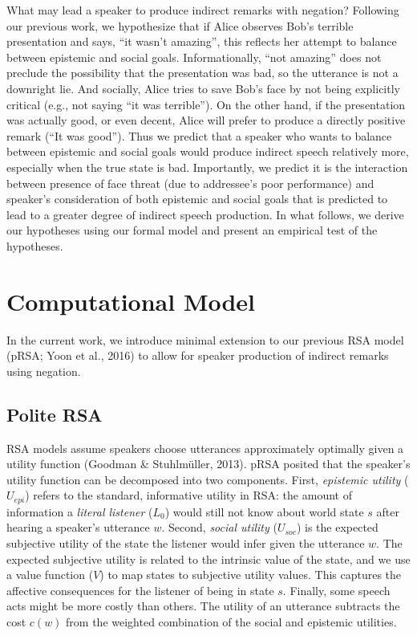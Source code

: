 \documentclass[10pt, letterpaper]{article}
\begin{document}
What may lead a speaker to produce indirect remarks with negation?
Following our previous work, we hypothesize that if Alice observes Bob's
terrible presentation and says, ``it wasn't amazing'', this reflects her
attempt to balance between epistemic and social goals. Informationally,
``not amazing'' does not preclude the possibility that the presentation
was bad, so the utterance is not a downright lie. And socially, Alice
tries to save Bob's face by not being explicitly critical (e.g., not
saying ``it was terrible''). On the other hand, if the presentation was
actually good, or even decent, Alice will prefer to produce a directly
positive remark (``It was good''). Thus we predict that a speaker who
wants to balance between epistemic and social goals would produce
indirect speech relatively more, especially when the true state is bad.
Importantly, we predict it is the interaction between presence of face
threat (due to addressee's poor performance) and speaker's consideration
of both epistemic and social goals that is predicted to lead to a
greater degree of indirect speech production. In what follows, we derive
our hypotheses using our formal model and present an empirical test of
the hypotheses.

\section{Computational Model}\label{computational-model}

In the current work, we introduce minimal extension to our previous RSA
model (pRSA; Yoon et al., 2016) to allow for speaker production of
indirect remarks using negation.

\subsection{Polite RSA}\label{polite-rsa}

RSA models assume speakers choose utterances approximately optimally
given a utility function (Goodman \& Stuhlmüller, 2013). pRSA posited
that the speaker's utility function can be decomposed into two
components. First, \emph{epistemic utility} (\(U_{epi}\)) refers to the
standard, informative utility in RSA: the amount of information a
\emph{literal listener} (\(L_0\)) would still not know about world state
\(s\) after hearing a speaker's utterance \(w\). Second, \emph{social
utility} (\(U_{soc}\)) is the expected subjective utility of the state
the listener would infer given the utterance \(w\). The expected
subjective utility is related to the intrinsic value of the state, and
we use a value function (\(V\)) to map states to subjective utility
values. This captures the affective consequences for the listener of
being in state \(s\). Finally, some speech acts might be more costly
than others. The utility of an utterance subtracts the cost \(c(w)\)
from the weighted combination of the social and epistemic utilities.
\end{document}
